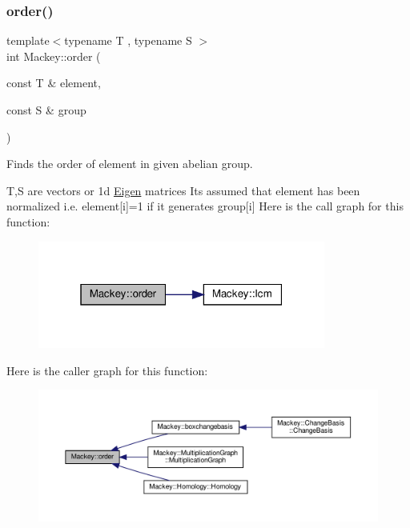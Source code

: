 \mbox{\label{namespaceMackey_a4abdca157edcf425b1e7ceff39d74c2f}} 
\subsubsection{\texorpdfstring{order()}{order()}}
{\footnotesize\ttfamily template$<$typename T , typename S $>$ \\
int Mackey\+::order (\begin{DoxyParamCaption}\item[{const T \&}]{element,  }\item[{const S \&}]{group }\end{DoxyParamCaption})}



Finds the order of element in given abelian group. 

T,S are vectors or 1d \hyperlink{namespaceEigen}{Eigen} matrices It\textquotesingle{}s assumed that element has been normalized i.\+e. element\mbox{[}i\mbox{]}=1 if it generates group\mbox{[}i\mbox{]} Here is the call graph for this function\+:\nopagebreak
\begin{figure}[H]
\begin{center}
\leavevmode
\includegraphics[width=268pt]{namespaceMackey_a4abdca157edcf425b1e7ceff39d74c2f_cgraph}
\end{center}
\end{figure}
Here is the caller graph for this function\+:\nopagebreak
\begin{figure}[H]
\begin{center}
\leavevmode
\includegraphics[width=350pt]{namespaceMackey_a4abdca157edcf425b1e7ceff39d74c2f_icgraph}
\end{center}
\end{figure}
\mbox{\label{namespaceMackey_ae54ebc8588d873a744541394ac5113f0}} 
